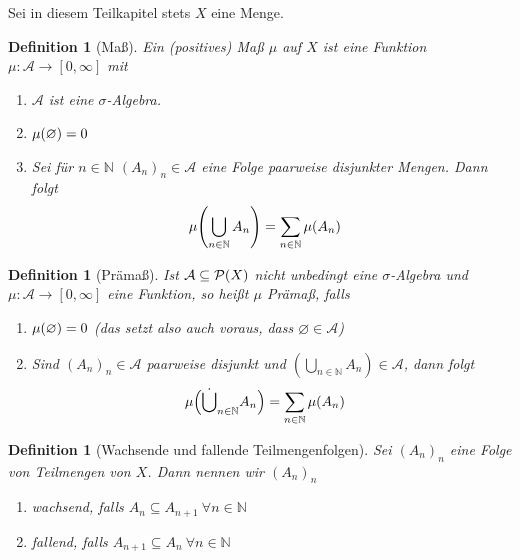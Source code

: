 \documentclass[11pt, twoside, a4paper]{article}
\theoremstyle{plain}
\newtheorem{definition}[blockelement]{Definition}
\numberwithin{equation}{subsection}
\newcommand{\pair}[1]{\left(#1\right)}
\newcommand{\of}[1]{\mathopen{}\mathclose{}\bgroup\left(#1\aftergroup\egroup\right)}
\newcommand{\interv}[1]{\left[#1\right]}
\renewcommand{\emptyset}{\varnothing}
\newcommand{\N}{\mathbb{N}}
\newcommand{\mA}{\mathcal{A}}
\begin{document}
    \begin{mdframed}
        \centering
        Sei in diesem Teilkapitel stets $X$ eine Menge.
    \end{mdframed}

    \begin{definition}[Maß]
        \marginnote{[25. Okt]}
        Ein (positives) Maß $\mu$ auf $X$ ist eine Funktion $\mu: \mA \to\interv{0,\infty}$ mit
        \begin{enumerate}[label=(\roman*)]
            \item $\mA$ ist eine $\sigma$-Algebra.
            \item $\mu\of{\emptyset} = 0$
            \item Sei für $n\in\N$ $(A_n)_n\in\mA$ eine Folge paarweise disjunkter Mengen. Dann folgt
            \begin{align*}
                \mu\of{\bigcup_{n\in\N} A_n} &= \sum_{n\in\N}^{} \mu\of{A_n}
            \end{align*}
        \end{enumerate}
    \end{definition}

    \begin{definition}[Prämaß]
        Ist $\mA\subseteq\mathcal{P}\of{X}$ nicht unbedingt eine $\sigma$-Algebra und $\mu: \mA\to\interv{0,\infty}$ eine Funktion, so heißt $\mu$ Prämaß, falls
        \begin{enumerate}[label=(\roman*)]
            \item $\mu\of{\emptyset} = 0$ (das setzt also auch voraus, dass $\emptyset\in\mA$)
            \item Sind $(A_n)_n\in\mA$ paarweise disjunkt und $\pair{\bigcup_{n\in\N} A_n}\in\mA$, dann folgt
            \begin{align*}
                \mu\of{\dot\bigcup_{n\in\N} A_n} &= \sum_{n\in\N}^{} \mu\of{A_n}
            \end{align*}
        \end{enumerate}
    \end{definition}

    \begin{definition}[Wachsende und fallende Teilmengenfolgen]
        Sei $(A_n)_n$ eine Folge von Teilmengen von $X$. Dann nennen wir $(A_n)_n$
        \begin{enumerate}[label=-]
            \item wachsend, falls $A_n \subseteq A_{n+1}~\forall n\in\N$
            \item fallend, falls $A_{n+1} \subseteq A_{n}~\forall n\in\N$
        \end{enumerate}
    \end{definition}
\end{document}

